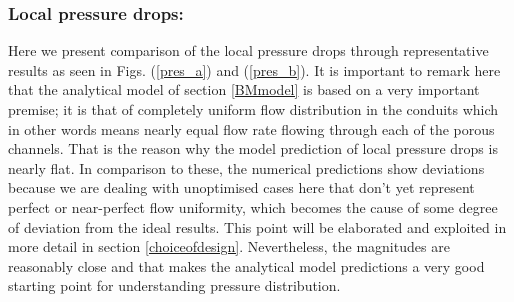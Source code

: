 \documentclass[twocolumn,10pt,cleanfoot]{ihmtc}
\begin{document}
\subsubsection*{Local pressure drops:} Here we present comparison of the local pressure drops through representative results as seen in Figs. (\ref{pres_a}) and (\ref{pres_b}). It is important to remark here that the analytical model of section \ref{BMmodel} is based on a very important premise; it is that of completely uniform flow distribution in the conduits which in other words means nearly equal flow rate flowing through each of the porous channels. That is the reason why the model prediction of local pressure drops is nearly flat. In comparison to these, the numerical predictions show deviations because we are dealing with unoptimised cases here that don't yet represent perfect or near-perfect flow uniformity, which becomes the cause of some degree of deviation from the ideal results. This point will be elaborated and exploited in more detail in section \ref{choiceofdesign}. Nevertheless, the magnitudes are reasonably close and that makes the analytical model predictions a very good starting point for understanding pressure distribution. 
%
\end{document}
